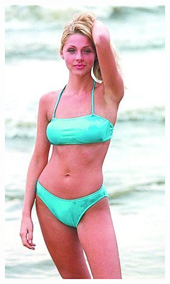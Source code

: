 \begin{figure}[!hbt]
     \centering
     \begin{subfigure}[b]{0.25\textwidth}
         \centering
         \includegraphics[width=\textwidth]{images/datasets/0487.jpg}
         \caption{}
         \label{fig:tdsd-gt-x}
     \end{subfigure}
     \hfill
     \begin{subfigure}[b]{0.25\textwidth}
         \centering

\end{subfigure}
\end{figure}
